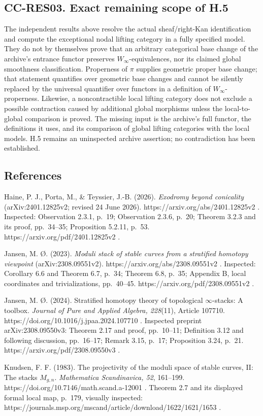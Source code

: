 \subsection{CC-RES03. Exact remaining scope of
H.5}\label{cc-res03.-exact-remaining-scope-of-h.5}

The independent results above resolve the actual sheaf/right-Kan
identification and compute the exceptional nodal lifting category in a
fully specified model. They do not by themselves prove that an arbitrary
categorical base change of the archive's entrance functor preserves
\(W_\infty\)-equivalences, nor its claimed global smoothness
classification. Properness of \(\pi\) supplies geometric proper base
change; that statement quantifies over geometric base changes and cannot
be silently replaced by the universal quantifier over functors in a
definition of \(W_\infty\)-properness. Likewise, a noncontractible local
lifting category does not exclude a possible contraction caused by
additional global morphisms unless the local-to-global comparison is
proved. The missing input is the archive's full functor, the definitions
it uses, and its comparison of global lifting categories with the local
models. H.5 remains an uninspected archive assertion; no contradiction
has been established.

\subsection{References}\label{references}

Haine, P. J., Porta, M., \& Teyssier, J.-B. (2026). \emph{Exodromy
beyond conicality} (arXiv:2401.12825v2; revised 24 June 2026).
https://arxiv.org/abs/2401.12825v2 . Inspected: Observation 2.3.1,
p.~19; Observation 2.3.6, p.~20; Theorem 3.2.3 and its proof,
pp.~34--35; Proposition 5.2.11, p.~53.
https://arxiv.org/pdf/2401.12825v2 .

Jansen, M. Ø. (2023). \emph{Moduli stack of stable curves from a
stratified homotopy viewpoint} (arXiv:2308.09551v2).
https://arxiv.org/abs/2308.09551v2 . Inspected: Corollary 6.6 and
Theorem 6.7, p.~34; Theorem 6.8, p.~35; Appendix B, local coordinates
and trivializations, pp.~40--45. https://arxiv.org/pdf/2308.09551v2 .

Jansen, M. Ø. (2024). Stratified homotopy theory of topological
\(\infty\)-stacks: A toolbox. \emph{Journal of Pure and Applied Algebra,
228}(11), Article 107710. https://doi.org/10.1016/j.jpaa.2024.107710 .
Inspected preprint arXiv:2308.09550v3: Theorem 2.17 and proof,
pp.~10--11; Definition 3.12 and following discussion, pp.~16--17; Remark
3.15, p.~17; Proposition 3.24, p.~21. https://arxiv.org/pdf/2308.09550v3
.

Knudsen, F. F. (1983). The projectivity of the moduli space of stable
curves, II: The stacks \(M_{g,n}\). \emph{Mathematica Scandinavica, 52},
161--199. https://doi.org/10.7146/math.scand.a-12001 . Theorem 2.7 and
its displayed formal local map, p.~179, visually inspected:
https://journals.msp.org/mscand/article/download/1622/1621/1653 .
